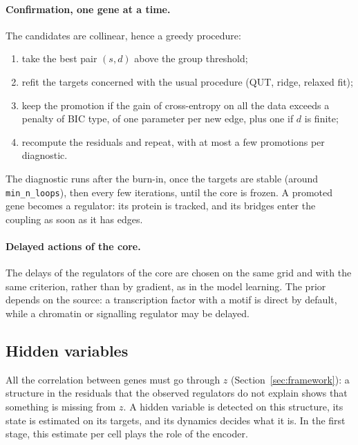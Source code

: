 \documentclass[a4paper, 11pt]{article}
\theoremstyle{plain}
\theoremstyle{remark}
\begin{document}
\paragraph{Confirmation, one gene at a time.} The candidates are collinear, hence a greedy procedure:
\begin{enumerate}[nosep]
\item take the best pair $(s, d)$ above the group threshold;
\item refit the targets concerned with the usual procedure (QUT, ridge, relaxed fit);
\item keep the promotion if the gain of cross-entropy on all the data exceeds a penalty of BIC type, of one parameter per new edge, plus one if $d$ is finite;
\item recompute the residuals and repeat, with at most a few promotions per diagnostic.
\end{enumerate}
The diagnostic runs after the burn-in, once the targets are stable (around \texttt{min\_n\_loops}), then every few iterations, until the core is frozen. A promoted gene becomes a regulator: its protein is tracked, and its bridges enter the coupling as soon as it has edges.

\paragraph{Delayed actions of the core.} The delays of the regulators of the core are chosen on the same grid and with the same criterion, rather than by gradient, as in the model learning. The prior depends on the source: a transcription factor with a motif is direct by default, while a chromatin or signalling regulator may be delayed.

\subsection{Hidden variables}\label{sec:hidden-stage1}

All the correlation between genes must go through $z$ (Section~\ref{sec:framework}): a structure in the residuals that the observed regulators do not explain shows that something is missing from $z$. A hidden variable is detected on this structure, its state is estimated on its targets, and its dynamics decides what it is. In the first stage, this estimate per cell plays the role of the encoder.
\end{document}

